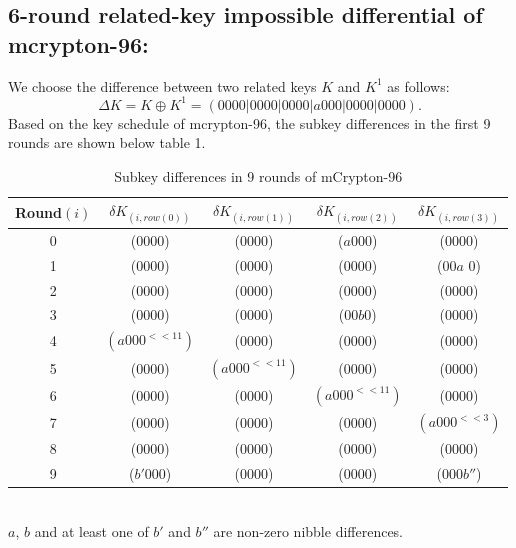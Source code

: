 \documentclass{transcrypto}
\begin{document}
	\subsection{6-round related-key impossible differential of mcrypton-96:}
	We choose the difference between two related keys $K$ and $K^1$ as follows:\\
	$$\Delta K = K \oplus K^1 = (0000|0000|0000|a000|0000|0000).$$
	Based on the key schedule of mcrypton-96, the subkey differences in the first 9 rounds are shown below table 1.
	\begin{table}[H]
		\centering
		\begin{tabular}{c c c c c}
			\hline
			Round$(i)$ & $\delta K_(i,row(0))$ & $\delta K_(i,row(1))$ & $\delta K_(i,row(2))$ & $\delta K_(i,row(3))$\\
			\hline
			0 & (0000) & (0000) & ($a$000) & (0000)\\
			1 & (0000) & (0000) & (0000) & (00$a$	0)\\
			2 & (0000) & (0000) & (0000) & (0000)\\
			3 & (0000) & (0000) & (00$b$0) & (0000)\\
			4 & $(a000^{<<11})$ & (0000) & (0000) & (0000)\\
			5 & (0000) & $(a000^{<<11})$ & (0000) & (0000)\\
			6 & (0000) & (0000) & $(a000^{<<11})$ & (0000)\\
			7 & (0000) & (0000) & (0000) & $(a000^{<<3})$\\
			8 & (0000) & (0000) & (0000) & (0000)\\
			9 & ($b'$000) & (0000) & (0000) & (000$b''$)\\
			\hline
			 
		\end{tabular}\\
	$a$, $b$ and at least one of $b'$ and $b''$ are non-zero nibble differences.
	\caption{Subkey differences in 9 rounds of mCrypton-96}
	\end{table}
\end{document}

